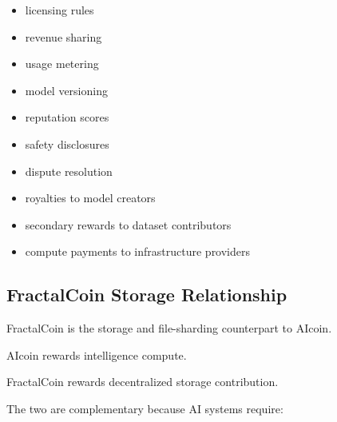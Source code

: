 ﻿\documentclass[12pt]{article}
\begin{document}
\begin{itemize}
  \item licensing rules
\end{itemize}
\begin{itemize}
  \item revenue sharing
\end{itemize}
\begin{itemize}
  \item usage metering
\end{itemize}
\begin{itemize}
  \item model versioning
\end{itemize}
\begin{itemize}
  \item reputation scores
\end{itemize}
\begin{itemize}
  \item safety disclosures
\end{itemize}
\begin{itemize}
  \item dispute resolution
\end{itemize}
\begin{itemize}
  \item royalties to model creators
\end{itemize}
\begin{itemize}
  \item secondary rewards to dataset contributors
\end{itemize}
\begin{itemize}
  \item compute payments to infrastructure providers
\end{itemize}

\subsection{FractalCoin Storage Relationship}


FractalCoin is the storage and file-sharding counterpart to AIcoin.

AIcoin rewards intelligence compute.

FractalCoin rewards decentralized storage contribution.

The two are complementary because AI systems require:
\end{document}
